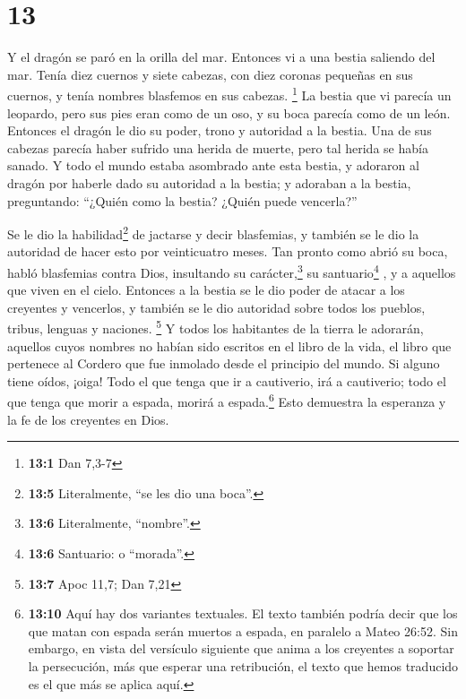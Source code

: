 \hypertarget{section-12}{%
\section{13}\label{section-12}}

 Y el dragón se paró en la orilla del mar. Entonces vi a
una bestia saliendo del mar. Tenía diez cuernos y siete cabezas, con
diez coronas pequeñas en sus cuernos, y tenía nombres blasfemos en sus
cabezas. \footnote{\textbf{13:1} Dan 7,3-7}  La bestia que
vi parecía un leopardo, pero sus pies eran como de un oso, y su boca
parecía como de un león. Entonces el dragón le dio su poder, trono y
autoridad a la bestia.  Una de sus cabezas parecía haber
sufrido una herida de muerte, pero tal herida se había sanado. Y todo el
mundo estaba asombrado ante esta bestia,  y adoraron al
dragón por haberle dado su autoridad a la bestia; y adoraban a la
bestia, preguntando: ``¿Quién como la bestia? ¿Quién puede vencerla?''

 Se le dio la habilidad\footnote{\textbf{13:5}
  Literalmente, ``se les dio una boca''.} de jactarse y decir
blasfemias, y también se le dio la autoridad de hacer esto por
veinticuatro meses.  Tan pronto como abrió su boca, habló
blasfemias contra Dios, insultando su carácter,\footnote{\textbf{13:6}
  Literalmente, ``nombre''.} su santuario\footnote{\textbf{13:6}
  Santuario: o ``morada''.} , y a aquellos que viven en el cielo.
 Entonces a la bestia se le dio poder de atacar a los
creyentes y vencerlos, y también se le dio autoridad sobre todos los
pueblos, tribus, lenguas y naciones. \footnote{\textbf{13:7} Apoc 11,7;
  Dan 7,21}  Y todos los habitantes de la tierra le
adorarán, aquellos cuyos nombres no habían sido escritos en el libro de
la vida, el libro que pertenece al Cordero que fue inmolado desde el
principio del mundo.  Si alguno tiene oídos, ¡oiga!
 Todo el que tenga que ir a cautiverio, irá a cautiverio;
todo el que tenga que morir a espada, morirá a espada.\footnote{\textbf{13:10}
  Aquí hay dos variantes textuales. El texto también podría decir que
  los que matan con espada serán muertos a espada, en paralelo a Mateo
  26:52. Sin embargo, en vista del versículo siguiente que anima a los
  creyentes a soportar la persecución, más que esperar una retribución,
  el texto que hemos traducido es el que más se aplica aquí.} Esto
demuestra la esperanza y la fe de los creyentes en Dios.

